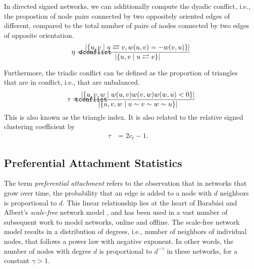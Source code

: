 \documentclass{article}
\def\mathnote#1{%
  \tag*{\rlap{\hspace\marginparsep\smash{\parbox[t]{\marginparwidth}{#1}}}}
}
\begin{document}
In directed signed networks, we can additionally compute the dyadic
conflict, i.e., the propostion of node pairs connected by two oppositely
oriented edges of different, compared to the total number of pairs of
nodes connected by two edges of opposite orientation. 
\begin{align}
  \mathnote{\texttt{dconflict}}
  \eta &= \frac 
       {|\{ u,v \mid u \rightleftarrows v, w(u,v) = - w(v,u) \}|} 
       {|\{ u, v \mid u \rightleftarrows v \}|}
\end{align}

Furthermore, the triadic conflict can be defined as the proportion of
triangles that are in conflict, i.e., that are unbalanced. 
\begin{align}
  \mathnote{\texttt{tconflict}}  
  \tau &= \frac 
  {|\{ u, v, w \mid w(u, v) w(v, w) w(w, u) < 0\}|}
  {|\{ u, v, w \mid u \sim v \sim w \sim u \}|}
\end{align}
This is also known as the triangle index.
It is also related to the relative signed clustering coefficient by
\begin{align*}
\tau &= 2 c_{\mathrm r} - 1.
\end{align*}

\subsection{Preferential Attachment Statistics}
The term \emph{preferential attachment} refers to the observation that
in networks that grow over time, the probability that an edge is added
to a node with $d$ neighbors is proportional to $d$.  This linear
relationship lies at the heart of Barabási and Albert's
\emph{scale-free} network model \citep{b439}, and has been used in a vast
number of subsequent work to model networks, online and offline. The
scale-free network model results in a distribution of degrees, i.e.,
number of neighbors of individual nodes, that follows a power law with
negative exponent. In other words, the number of nodes with degree $d$ is
proportional to $d^{-\gamma}$ in these networks, for a constant
$\gamma>1$.
\end{document}
